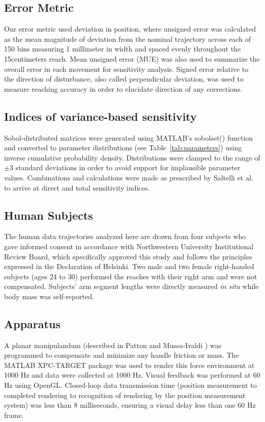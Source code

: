 \documentclass[10pt]{article}
\begin{document}
\subsection*{Error Metric}
Our error metric used deviation in position, where unsigned error was calculated as the mean magnitude of deviation from the nominal trajectory across each of 150 bins measuring 1 millimeter in width and spaced evenly throughout the 15centimeters reach.  Mean unsigned error (MUE) was also used to summarize the overall error in each movement for sensitivity analysis. Signed error relative to the direction of disturbance, also called perpendicular deviation, was used to measure reaching accuracy in order to elucidate direction of any corrections.

\subsection*{Indices of variance-based sensitivity}
Sobol-distributed matrices were generated using MATLAB's sobolset() function and converted to parameter distributions (see Table~\ref{tab:parameters}) using inverse cumulative probability density. Distributions were clamped to the range of $\pm3$ standard deviations in order to avoid support for implausible parameter values. Combinations and calculations were made as prescribed by Saltelli et al. \cite{saltelli2010variance} to arrive at direct and total sensitivity indices.

\subsection*{Human Subjects}
The human data trajectories analyzed here are drawn from four subjects who gave informed consent in accordance with Northwestern University Institutional Review Board, which specifically approved this study and follows the principles expressed in the Declaration of Helsinki. Two male and two female right-handed subjects (ages 24 to 30) performed the reaches with their right arm and were not compensated. Subjects' arm segment lengths were directly measured \textit{in situ} while body mass was self-reported.

\subsection*{Apparatus}
A planar manipulandum (described in Patton and Mussa-Ivaldi \cite{patton2004robot}) was programmed to compensate and minimize any handle friction or mass. The MATLAB XPC-TARGET package \cite{MATLAB:2008} was used to render this force environment at 1000 Hz and data were collected at 1000 Hz.  Visual feedback was performed at 60 Hz using OpenGL. Closed-loop data transmission time (position measurement to completed rendering to recognition of rendering by the position measurement system) was less than 8 milliseconds, ensuring a visual delay less than one 60 Hz frame.
\end{document}
